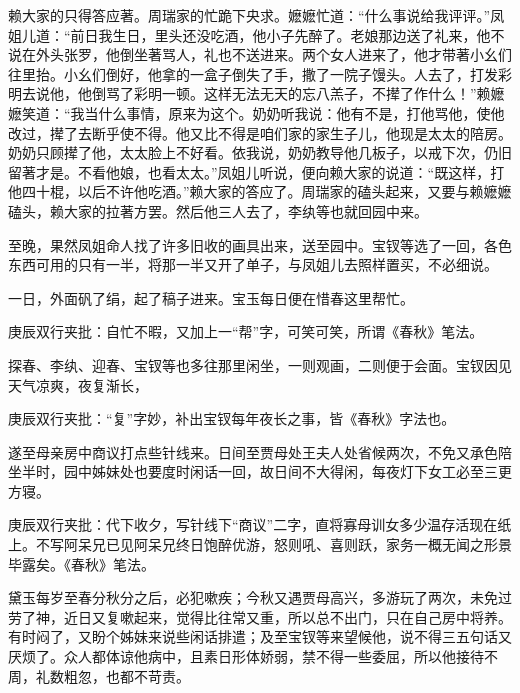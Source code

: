 \begin{parag}


    赖大家的只得答应著。周瑞家的忙跪下央求。嬷嬷忙道：“什么事说给我评评。”凤姐儿道：“前日我生日，里头还没吃酒，他小子先醉了。老娘那边送了礼来，他不说在外头张罗，他倒坐著骂人，礼也不送进来。两个女人进来了，他才带著小幺们往里抬。小幺们倒好，他拿的一盒子倒失了手，撒了一院子馒头。人去了，打发彩明去说他，他倒骂了彩明一顿。这样无法无天的忘八羔子，不撵了作什么！”赖嬷嬷笑道：“我当什么事情，原来为这个。奶奶听我说：他有不是，打他骂他，使他改过，撵了去断乎使不得。他又比不得是咱们家的家生子儿，他现是太太的陪房。奶奶只顾撵了他，太太脸上不好看。依我说，奶奶教导他几板子，以戒下次，仍旧留著才是。不看他娘，也看太太。”凤姐儿听说，便向赖大家的说道：“既这样，打他四十棍，以后不许他吃酒。”赖大家的答应了。周瑞家的磕头起来，又要与赖嬷嬷磕头，赖大家的拉著方罢。然后他三人去了，李纨等也就回园中来。
\end{parag}


\begin{parag}


    至晚，果然凤姐命人找了许多旧收的画具出来，送至园中。宝钗等选了一回，各色东西可用的只有一半，将那一半又开了单子，与凤姐儿去照样置买，不必细说。
\end{parag}


\begin{parag}


    一日，外面矾了绢，起了稿子进来。宝玉每日便在惜春这里帮忙。\begin{note}庚辰双行夹批：自忙不暇，又加上一“帮”字，可笑可笑，所谓《春秋》笔法。\end{note}探春、李纨、迎春、宝钗等也多往那里闲坐，一则观画，二则便于会面。宝钗因见天气凉爽，夜复渐长，\begin{note}庚辰双行夹批：“复”字妙，补出宝钗每年夜长之事，皆《春秋》字法也。\end{note}遂至母亲房中商议打点些针线来。日间至贾母处王夫人处省候两次，不免又承色陪坐半时，园中姊妹处也要度时闲话一回，故日间不大得闲，每夜灯下女工必至三更方寝。\begin{note}庚辰双行夹批：代下收夕，写针线下“商议”二字，直将寡母训女多少温存活现在纸上。不写阿呆兄已见阿呆兄终日饱醉优游，怒则吼、喜则跃，家务一概无闻之形景毕露矣。《春秋》笔法。\end{note}黛玉每岁至春分秋分之后，必犯嗽疾；今秋又遇贾母高兴，多游玩了两次，未免过劳了神，近日又复嗽起来，觉得比往常又重，所以总不出门，只在自己房中将养。有时闷了，又盼个姊妹来说些闲话排遣；及至宝钗等来望候他，说不得三五句话又厌烦了。众人都体谅他病中，且素日形体娇弱，禁不得一些委屈，所以他接待不周，礼数粗忽，也都不苛责。
\end{parag}



